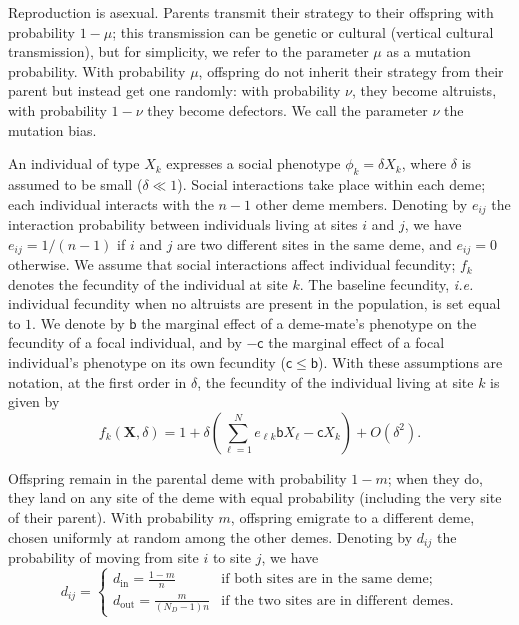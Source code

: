 \documentclass[11pt, letterpaper]{article}
\newcommand{\ie}{\textit{i.e.}}
\newcommand{\bigO}[1]{O\left( #1 \right)}
\newcommand{\bb}{\mathsf{b}}
\newcommand{\cc}{\mathsf{c}}
\newcommand{\mutbias}{\nu}
\newcommand{\inn}{\textrm{in}}
\newcommand{\out}{\textrm{out}}
\newcommand{\din}{d_{\inn}}
\newcommand{\dout}{d_{\out}}
\newcommand{\ndemes}{N_D}
\begin{document}
Reproduction is asexual. Parents transmit their strategy to their offspring with probability $1-\mu$; this transmission can be genetic or cultural (vertical cultural transmission), but for simplicity, we refer to the parameter $\mu$ as a mutation probability. With probability $\mu$, offspring do not inherit their strategy from their parent but instead get one randomly: with probability $\mutbias$, they become altruists, with probability $1-\mutbias$ they become defectors. We call the parameter $\mutbias$ the mutation bias. 

An individual of type $X_k$ expresses a social phenotype $\phi_k = \delta X_k$, where $\delta$ is assumed to be small ($\delta \ll 1$). Social interactions take place within each deme; each individual interacts with the $n-1$ other deme members. Denoting by $e_{ij}$ the interaction probability between individuals living at sites $i$ and $j$, we have $e_{ij} = 1/(n-1)$ if $i$ and $j$ are two different sites in the same deme, and $e_{ij}=0$ otherwise. We assume that social interactions affect individual fecundity; $f_k$ denotes the fecundity of the individual at site $k$. The baseline fecundity, \ie{} individual fecundity when no altruists are present in the population, is set equal to $1$. We denote by $\bb$ the marginal effect of a deme-mate's phenotype on the fecundity of a focal individual, and by $-\cc$ the marginal effect of a focal individual's phenotype on its own fecundity ($\cc \leq \bb$). With these assumptions are notation, at the first order in $\delta$, the fecundity of the individual living at site $k$ is given by 
\begin{equation}\label{eq:deff}
f_k(\mathbf{X}, \delta) = 1 + \delta \left( \sum_{\ell =1}^N e_{\ell k} \bb X_{\ell} - \cc X_k \right) + \bigO{\delta^2}.
\end{equation}

Offspring remain in the parental deme with probability $1-m$; when they do, they land on any site of the deme with equal probability (including the very site of their parent). With probability $m$, offspring emigrate to a different deme, chosen uniformly at random among the other demes. Denoting by $d_{ij}$ the probability of moving from site $i$ to site $j$, we have
\begin{equation}\label{eq:defD}
d_{ij} = \begin{cases}
 \din =  \frac{1-m}{n} & \textrm{if both sites are in the same deme;}\\
 \dout = \frac{m}{(\ndemes-1) n} & \textrm{if the two sites are in different demes.} 
\end{cases}
\end{equation}
\end{document}
